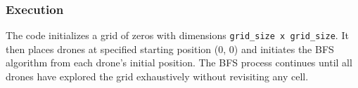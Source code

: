 \subsubsection{Execution}

The code initializes a grid of zeros with dimensions \texttt{grid\_size x grid\_size}. It then places drones at specified starting position (0, 0) and initiates the BFS algorithm from each drone's initial position. The BFS process continues until all drones have explored the grid exhaustively without revisiting any cell.
